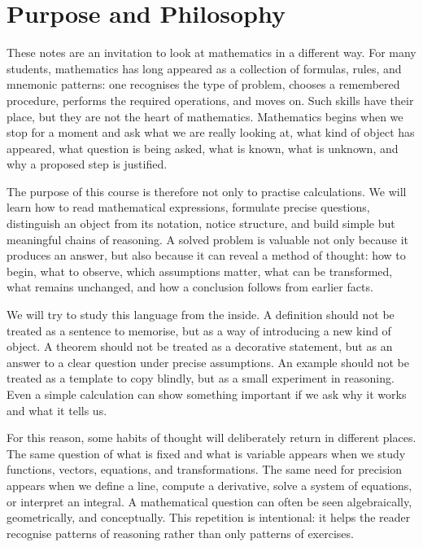 \section*{Purpose and Philosophy}

These notes are an invitation to look at mathematics in a different way. For
many students, mathematics has long appeared as a collection of formulas,
rules, and mnemonic patterns: one recognises the type of problem, chooses a
remembered procedure, performs the required operations, and moves on. Such
skills have their place, but they are not the heart of mathematics. Mathematics
begins when we stop for a moment and ask what we are really looking at, what
kind of object has appeared, what question is being asked, what is known, what
is unknown, and why a proposed step is justified.

The purpose of this course is therefore not only to practise calculations. We
will learn how to read mathematical expressions, formulate precise questions,
distinguish an object from its notation, notice structure, and build simple but
meaningful chains of reasoning. A solved problem is valuable not only because
it produces an answer, but also because it can reveal a method of thought: how
to begin, what to observe, which assumptions matter, what can be transformed,
what remains unchanged, and how a conclusion follows from earlier facts.

We will try to study this language from the inside. A definition should not be
treated as a sentence to memorise, but as a way of introducing a new kind of
object. A theorem should not be treated as a decorative statement, but as an
answer to a clear question under precise assumptions. An example should not be
treated as a template to copy blindly, but as a small experiment in reasoning.
Even a simple calculation can show something important if we ask why it works
and what it tells us.

For this reason, some habits of thought will deliberately return in different
places. The same question of what is fixed and what is variable appears when we
study functions, vectors, equations, and transformations. The same need for
precision appears when we define a line, compute a derivative, solve a system
of equations, or interpret an integral. A mathematical question can often be
seen algebraically, geometrically, and conceptually. This repetition is
intentional: it helps the reader recognise patterns of reasoning rather than
only patterns of exercises.

